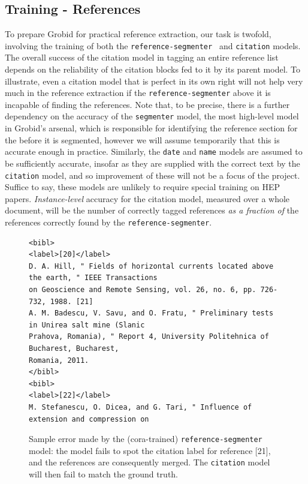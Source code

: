 \documentclass[11pt, oneside]{scrartcl}   	%
\begin{document}
\subsection{Training - References}

To prepare Grobid for practical reference extraction, our task is twofold, involving the training of both the \texttt{reference-segmenter } and \texttt{citation} models. The overall success of the citation model in tagging an entire reference list depends on the reliability of the citation blocks fed to it by its parent model. To illustrate, even a citation model that is perfect in its own right will not help very much in the reference extraction if the \texttt{reference-segmenter} above it is incapable of finding the references. Note that, to be precise, there is a further dependency on the accuracy of the \texttt{segmenter} model, the most high-level model in Grobid's arsenal, which is responsible for identifying the reference section for the before it is segmented, however we will assume temporarily that this is accurate enough in practice. Similarly, the \texttt{date} and \texttt{name} models are assumed to be sufficiently accurate, insofar as they are supplied with the correct text by the \texttt{citation} model, and so improvement of these will not be a focus of the project. Suffice to say, these models are unlikely to require special training on HEP papers. \emph{Instance-level} accuracy for the citation model, measured over a whole document, will be the number of correctly tagged references \emph{as a fraction of} the references correctly found by the \texttt{reference-segmenter}.

\begin{figure}
\begin{verbatim}
<bibl>
<label>[20]</label>
D. A. Hill, " Fields of horizontal currents located above the earth, " IEEE Transactions
on Geoscience and Remote Sensing, vol. 26, no. 6, pp. 726-732, 1988. [21] 
A. M. Badescu, V. Savu, and O. Fratu, " Preliminary tests in Unirea salt mine (Slanic
Prahova, Romania), " Report 4, University Politehnica of Bucharest, Bucharest,
Romania, 2011.
</bibl>
<bibl>
<label>[22]</label>
M. Stefanescu, O. Dicea, and G. Tari, " Influence of extension and compression on
\end{verbatim}
\caption{Sample error made by the (cora-trained) \texttt{reference-segmenter} model: the model fails to spot the citation label for reference [21], and the references are consequently merged. The \texttt{citation} model will then fail to match the ground truth.}
\label{fig:segerror}
\end{figure}
\end{document}
